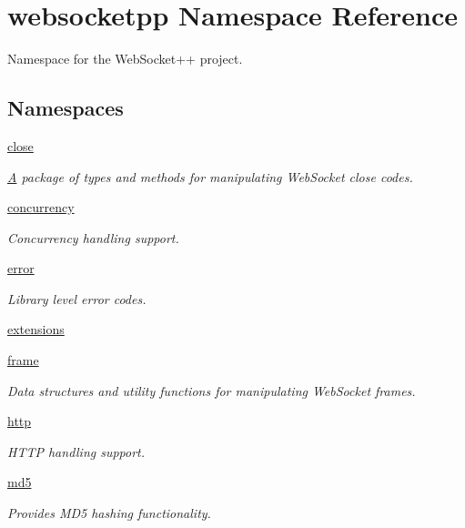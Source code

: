 \hypertarget{namespacewebsocketpp}{}\section{websocketpp Namespace Reference}
\label{namespacewebsocketpp}


Namespace for the Web\+Socket++ project.  


\subsection*{Namespaces}
\begin{DoxyCompactItemize}
\item 
 \mbox{\hyperlink{namespacewebsocketpp_1_1close}{close}}
\begin{DoxyCompactList}\small\item\em \mbox{\hyperlink{struct_a}{A}} package of types and methods for manipulating Web\+Socket close codes. \end{DoxyCompactList}\item 
 \mbox{\hyperlink{namespacewebsocketpp_1_1concurrency}{concurrency}}
\begin{DoxyCompactList}\small\item\em Concurrency handling support. \end{DoxyCompactList}\item 
 \mbox{\hyperlink{namespacewebsocketpp_1_1error}{error}}
\begin{DoxyCompactList}\small\item\em Library level error codes. \end{DoxyCompactList}\item 
 \mbox{\hyperlink{namespacewebsocketpp_1_1extensions}{extensions}}
\item 
 \mbox{\hyperlink{namespacewebsocketpp_1_1frame}{frame}}
\begin{DoxyCompactList}\small\item\em Data structures and utility functions for manipulating Web\+Socket frames. \end{DoxyCompactList}\item 
 \mbox{\hyperlink{namespacewebsocketpp_1_1http}{http}}
\begin{DoxyCompactList}\small\item\em H\+T\+TP handling support. \end{DoxyCompactList}\item 
 \mbox{\hyperlink{namespacewebsocketpp_1_1md5}{md5}}
\begin{DoxyCompactList}\small\item\em Provides M\+D5 hashing functionality. \end{DoxyCompactList}\item 

\end{DoxyCompactItemize}
